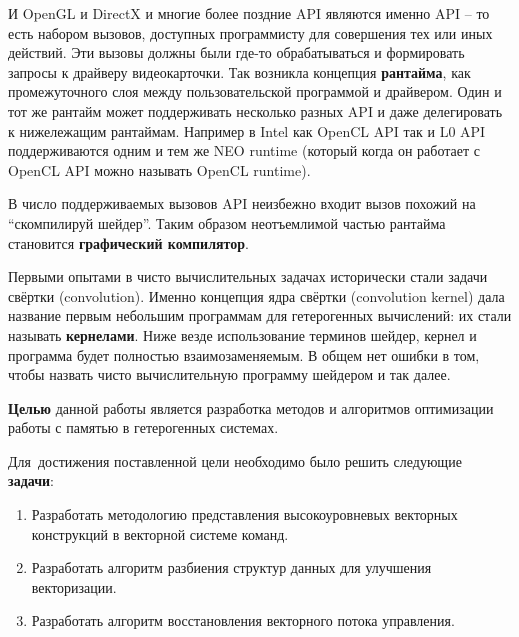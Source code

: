 И OpenGL и DirectX и многие более поздние API являются именно API -- то есть набором вызовов, доступных программисту для совершения тех или иных действий. Эти вызовы должны были где-то обрабатываться и формировать запросы к драйверу видеокарточки. Так возникла концепция \textbf{рантайма}, как промежуточного слоя между пользовательской программой и драйвером. Один и тот же рантайм может поддерживать несколько разных API и даже делегировать к нижележащим рантаймам. Например в Intel как OpenCL API так и L0 API поддерживаются одним и тем же NEO runtime (который когда он работает с OpenCL API можно называть OpenCL runtime).

В число поддерживаемых вызовов API неизбежно входит вызов похожий на ``скомпилируй шейдер''. Таким образом неотъемлимой частью рантайма становится \textbf{графический компилятор}.

Первыми опытами в чисто вычислительных задачах исторически стали задачи свёртки (convolution). Именно концепция ядра свёртки (convolution kernel) дала название первым небольшим программам для гетерогенных вычислений: их стали называть \textbf{кернелами}. Ниже везде использование терминов шейдер, кернел и программа будет полностью взаимозаменяемым. В общем нет ошибки в том, чтобы назвать чисто вычислительную программу шейдером и так далее.

\textbf{Целью} данной работы является разработка методов и алгоритмов оптимизации работы с памятью в гетерогенных системах.

Для~достижения поставленной цели необходимо было решить следующие \textbf{задачи}:
\begin{enumerate}[beginpenalty=10000] %
  \item Разработать методологию представления высокоуровневых векторных конструкций в векторной системе команд.
  \item Разработать алгоритм разбиения структур данных для улучшения векторизации.
  \item Разработать алгоритм восстановления векторного потока управления.
\end{enumerate}

\iffalse


\newcommand{\actuality}{}
\newcommand{\progress}{}
\newcommand{\aim}{{\textbf\aimTXT}}
\newcommand{\tasks}{\textbf{\tasksTXT}}
\newcommand{\novelty}{\textbf{\noveltyTXT}}
\newcommand{\influence}{\textbf{\influenceTXT}}
\newcommand{\methods}{\textbf{\methodsTXT}}
\newcommand{\defpositions}{\textbf{\defpositionsTXT}}
\newcommand{\reliability}{\textbf{\reliabilityTXT}}
\newcommand{\probation}{\textbf{\probationTXT}}
\newcommand{\contribution}{\textbf{\contributionTXT}}
\newcommand{\publications}{\textbf{\publicationsTXT}}

